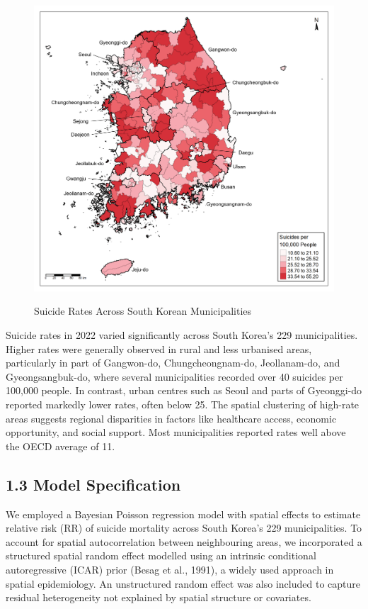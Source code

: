 \documentclass[11pt]{article}
\begin{document}
	\begin{figure}[H]
		\centering
		\caption{Suicide Rates Across South Korean Municipalities}
		\includegraphics[width=1\textwidth]{assets/suicide_map/suicide_map_2022_annotated.png}
		\label{fig:suicide_map_2022}
	\end{figure}
	
	Suicide rates in 2022 varied significantly across South Korea's 229 municipalities. Higher rates were generally observed in rural and less urbanised areas, particularly in part of Gangwon-do, Chungcheongnam-do, Jeollanam-do, and Gyeongsangbuk-do, where several municipalities recorded over 40 suicides per 100,000 people. In contrast, urban centres such as Seoul and parts of Gyeonggi-do reported markedly lower rates, often below 25. The spatial clustering of high-rate areas suggests regional disparities in factors like healthcare access, economic opportunity, and social support. Most municipalities reported rates well above the OECD average of 11.
	
	\newpage
	\subsection*{1.3 Model Specification}
	
	We employed a Bayesian Poisson regression model with spatial effects to estimate relative risk (RR) of suicide mortality across South Korea's 229 municipalities. To account for spatial autocorrelation between neighbouring areas, we incorporated a structured spatial random effect modelled using an intrinsic conditional autoregressive (ICAR) prior (Besag et al., 1991), a widely used approach in spatial epidemiology. An unstructured random effect was also included to capture residual heterogeneity not explained by spatial structure or covariates.
	
\end{document}
